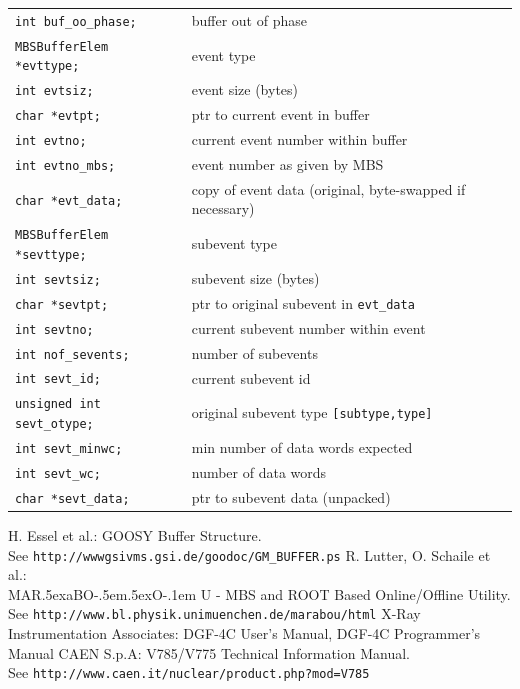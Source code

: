 \documentclass[10pt]{article}
\def\MARaBOU{MAR\lower.5ex\hbox{a}BO\kern-.5em\lower.5ex\hbox{O}\kern-.1em U}%
\begin{document}
\begin{center}
\begin{tabular}{ll}
	\verb+int buf_oo_phase;+			&		buffer out of phase \\
	\verb+MBSBufferElem *evttype;+			&		event type	\\
	\verb+int evtsiz;+				&		event size (bytes)	\\
	\verb+char *evtpt;+ 				&		ptr to current event in buffer	\\
	\verb+int evtno;+				&		current event number within buffer	\\
	\verb+int evtno_mbs;+				&		event number as given by MBS	\\
	\verb+char *evt_data;+				&		copy of event data (original, byte-swapped if necessary)	\\
	\verb+MBSBufferElem *sevttype;+ 		&		subevent type	\\
	\verb+int sevtsiz;+ 				&		subevent size (bytes)	\\
	\verb+char *sevtpt;+				&		ptr to original subevent in \verb+evt_data+	\\
	\verb+int sevtno;+				&		current subevent number within event	\\
	\verb+int nof_sevents;+ 			&		number of subevents	\\
	\verb+int sevt_id;+ 				&	        current subevent id \\
	\verb+unsigned int sevt_otype;+ 		&		original subevent type \verb+[subtype,type]+	\\
	\verb+int sevt_minwc;+				&		min number of data words expected \\
	\verb+int sevt_wc;+ 				&		number of data words \\
	\verb+char *sevt_data;+ 			&		ptr to subevent data (unpacked)
\end{tabular}
\end{center}

\newpage
\begin{thebibliography}{9}
 H. Essel et al.: GOOSY Buffer Structure.\\
See \texttt{http://www\-gsi\-vms.gsi.de/goodoc/GM\_BUFFER.ps}
 R. Lutter, O. Schaile et al.:\\
\MARaBOU{} - MBS and ROOT Based Online/Offline Utility.\\
See \texttt{http://www.bl.physik.uni\-muenchen.de/marabou/html}
 X-Ray Instrumentation Associates:
DGF-4C User's Manual, DGF-4C Programmer's Manual
 CAEN S.p.A: V785/V775 Technical Information Manual.\\
See \texttt{http://www.caen.it/nuclear/product.php?mod=V785}
\end{thebibliography}
\end{document}
